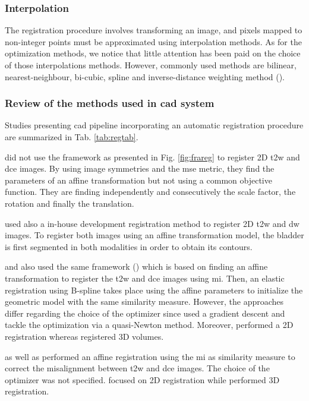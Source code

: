 \subsubsection{Interpolation}\label{subsubsec:int}

The registration procedure involves transforming an image, and pixels mapped to non-integer points must be approximated using interpolation methods. As for the optimization methods, we notice that little attention has been paid on the choice of those interpolations methods. However, commonly used methods are bilinear, nearest-neighbour, bi-cubic, spline and inverse-distance weighting method (\cite{Mitra2012}).

\subsubsection{Review of the methods used in \ac{cad} system}\label{subsubsec:regrev}

Studies presenting \ac{cad} pipeline incorporating an automatic registration procedure are summarized in Tab. \ref{tab:regtab}. 

\cite{Ampeliotis2007,Ampeliotis2008} did not use the framework as presented in Fig. \ref{fig:frareg} to register 2D \ac{t2w} and \ac{dce} images. By using image symmetries and the \ac{mse} metric, they find the parameters of an affine transformation but not using a common objective function. They are finding independently and consecutively the scale factor, the rotation and finally the translation.

\cite{Giannini2013} used also a in-house development registration method to register 2D \ac{t2w} and \ac{dw} images. To register both images using an affine transformation model, the bladder is first segmented in both modalities in order to obtain its contours.

\cite{Giannini2013} and also \cite{Vos2010} used the same framework (\cite{Rueckert1999}) which is based on finding an affine transformation to register the \ac{t2w} and \ac{dce} images using \ac{mi}. Then, an elastic registration using B-spline takes place using the affine parameters to initialize the geometric model with the  same similarity measure. However, the approaches differ regarding the choice of the optimizer since \cite{Giannini2013} used a gradient descent and \cite{Vos2010} tackle the optimization via a quasi-Newton method. Moreover, \cite{Giannini2013} performed a 2D registration whereas \cite{Vos2010} registered 3D volumes.

\cite{Viswanath2008a,Viswanath2009} as well as \cite{Vos2008} performed an affine registration using the \ac{mi} as similarity measure to correct the misalignment between \ac{t2w} and \ac{dce} images. The choice of the optimizer was not specified. \cite{Viswanath2008a,Viswanath2009} focused on 2D registration while \cite{Vos2008} performed 3D registration.

